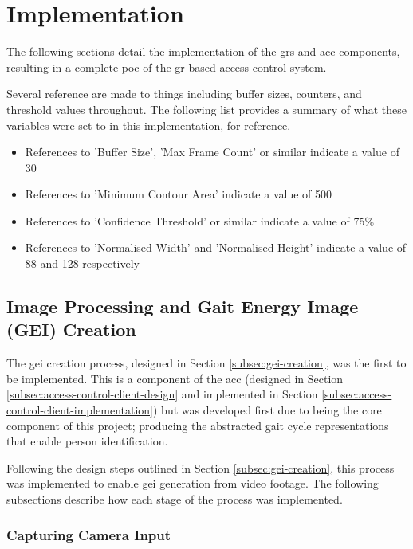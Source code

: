 \section{Implementation}
\label{sec:implementation}

The following sections detail the implementation of the \ac{grs} and \ac{acc} components, resulting in a complete \ac{poc} of the \ac{gr}-based access control system. 

Several reference are made to things including buffer sizes, counters, and threshold values throughout. The following list provides a summary of what these variables were set to in this implementation, for reference.

\begin{itemize}
	\item References to 'Buffer Size', 'Max Frame Count' or similar indicate a value of 30
	\item References to 'Minimum Contour Area' indicate a value of 500
	\item References to 'Confidence Threshold' or similar indicate a value of 75\%
	\item References to 'Normalised Width' and 'Normalised Height' indicate a value of 88 and 128 respectively
\end{itemize}


\subsection{Image Processing and Gait Energy Image (GEI) Creation}
\label{subsec:image-processing-gei}

The \ac{gei} creation process, designed in Section \ref{subsec:gei-creation}, was the first to be implemented.
This is a component of the \ac{acc} (designed in Section \ref{subsec:access-control-client-design} and implemented in Section \ref{subsec:access-control-client-implementation}) but was developed first due to being the core component of this project; producing the abstracted gait cycle representations that enable person identification.

Following the design steps outlined in Section \ref{subsec:gei-creation}, this process was implemented to enable \ac{gei} generation from video footage.
The following subsections describe how each stage of the process was implemented.

\subsubsection{Capturing Camera Input}

